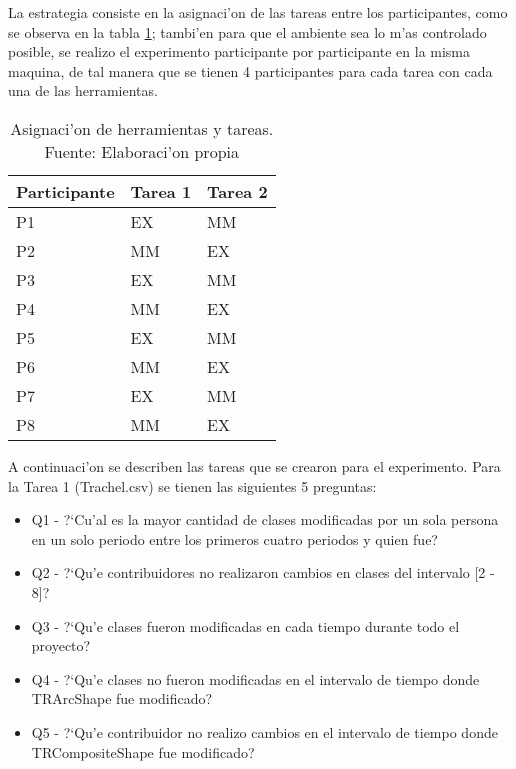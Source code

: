 La estrategia consiste en la asignaci'on de las tareas entre los participantes, como se observa en la tabla \ref{tab:Tabla4.1}; tambi'en para que el ambiente sea lo m'as controlado posible, se realizo el experimento participante por participante en la misma maquina, de tal manera que se tienen 4 participantes para cada tarea con cada una de las herramientas.

\begin{table}[h]
\centering
\begin{tabular}{l|l|l}
\textbf{Participante} & \textbf{Tarea 1} & \textbf{Tarea 2} \\ \hline
P1                    & EX               & MM               \\ \hline
P2                    & MM               & EX               \\ \hline
P3                    & EX               & MM               \\ \hline
P4                    & MM               & EX               \\ \hline
P5                    & EX               & MM               \\ \hline
P6                    & MM               & EX               \\ \hline
P7                    & EX               & MM               \\ \hline
P8                    & MM               & EX               \\ \hline
\end{tabular}
\caption{Asignaci'on de herramientas y tareas. Fuente: Elaboraci'on propia}
\label{tab:Tabla4.1}
\end{table}

A continuaci'on se describen las tareas que se crearon para el experimento. Para la Tarea 1 (Trachel.csv) se tienen las siguientes 5 preguntas: 
\begin{itemize}
\item Q1 - ?`Cu'al es la mayor cantidad de clases modificadas por un sola persona en un solo periodo entre los primeros cuatro periodos y quien fue?
\item Q2 - ?`Qu'e contribuidores no realizaron cambios en clases del intervalo [2 - 8]?
\item Q3 - ?`Qu'e clases fueron modificadas en cada tiempo durante todo el proyecto?
\item Q4 - ?`Qu'e clases no fueron modificadas en el intervalo de tiempo donde TRArcShape fue modificado?
\item Q5 - ?`Qu'e contribuidor no realizo cambios en el intervalo de tiempo donde TRCompositeShape fue modificado?
\end{itemize}

